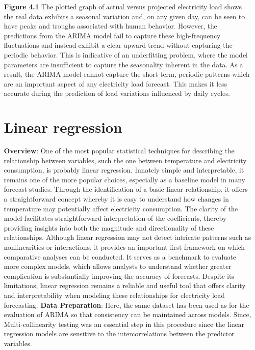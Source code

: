 \documentclass[12pt, a4paper,twoside]{report}
\theoremstyle{plain} %
\theoremstyle{definition} %
\theoremstyle{remark} %
\numberwithin{equation}{chapter}
\begin{document}
\textbf{Figure 4.1} The plotted graph of actual versus projected electricity load shows the real data exhibits a seasonal variation and, on any given day, can be seen to have peaks and troughs associated with human behavior. However, the predictions from the ARIMA model fail to capture these high-frequency fluctuations and instead exhibit a clear upward trend without capturing the periodic behavior. This is indicative of an underfitting problem, where the model parameters are insufficient to capture the seasonality inherent in the data. As a result, the ARIMA model cannot capture the short-term, periodic patterns which are an important aspect of any electricity load forecast. This makes it less accurate during the prediction of load variations influenced by daily cycles.

\section{Linear regression}\label{sec:3.2}
\textbf{Overview}:
\newline
One of the most popular statistical techniques for describing the relationship between variables, such the one between temperature and electricity consumption, is probably linear regression. Innately simple and interpretable, it remains one of the more popular choices, especially as a baseline model in many forecast studies. Through the identification of a basic linear relationship, it offers a straightforward concept whereby it is easy to understand how changes in temperature may potentially affect electricity consumption. The clarity of the model facilitates straightforward interpretation of the coefficients, thereby providing insights into both the magnitude and directionality of these relationships.
Although linear regression may not detect intricate patterns such as nonlinearities or interactions, it provides an important first framework on which comparative analyses can be conducted. It serves as a benchmark to evaluate more complex models, which allows analysts to understand whether greater complication is substantially improving the accuracy of forecasts. Despite its limitations, linear regression remains a reliable and useful tool that offers clarity and interpretability when modeling these relationships for electricity load forecasting.
\newline
\textbf{Data Preparation}:
\newline
Here, the same dataset has been used as for the evaluation of ARIMA so that consistency can be maintained across models. Since, Multi-collinearity testing was an essential step in this procedure since the linear regression models are sensitive to the intercorrelations between the predictor variables.
\end{document}
